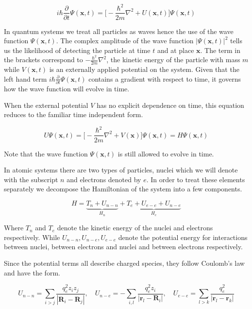 \begin{equation}
i\hbar \frac {\partial}{\partial t} \Psi (\textbf{x},t) = \big[ -\frac{\hbar ^2}{2m}\nabla^2 + U (\textbf{x}, t) \big] \Psi (\textbf{x},t) 
\label {schordinger_time_dependent}
\end{equation}

In quantum systems we treat all particles as waves hence the use of the wave function $\Psi (\textbf{x},t)$. The complex amplitude of the wave function $|\Psi (\textbf {x}, t)|^2$ tells us the likelihood of detecting the particle at time $t$ and at place $\textbf{x}$. The term in the brackets correspond to $-\frac{\hbar ^2}{2m}\nabla^2 $, the kinetic energy of the particle with mass $m$ while $V (\textbf{x}, t)$ is an externally applied potential on the system. Given that the left hand term $i\hbar \frac {\partial}{\partial t} \Psi (\textbf{x},t)$ contains a gradient with respect to time, it governs how the wave function will evolve in time.

When the external potential $V$ has no explicit dependence on time, this equation reduces to the familiar time independent form. 

\begin{equation}
	U \Psi (\textbf{x}, t) = \big[ -\frac{\hbar ^2}{2m}\nabla^2 + V (\textbf{x}) \big] \Psi (\textbf{x}, t) = H \Psi(\textbf{x}, t) 
 \end{equation}

Note that the wave function $\Psi (\textbf {x}, t)$ is still allowed to evolve in time. 

In atomic systems there are two types of particles, nuclei which we will denote with the subscript $n$ and electrons denoted by $e$. In order to treat these elements separately we decompose the Hamiltonian of the system into a few components. 

\begin {equation}
H = \underbrace{T_n + U_{n-n}}_{H_n} + \underbrace{T_e +  U_{e-e} + U_{n-e}}_{H_e}
\end {equation}

Where $T_n$ and $T_e$ denote the kinetic energy of the nuclei and electrons respectively. While $U_{n-n}, U_{n-e}, U_{e-e}$ denote the potential energy for interactions between nuclei, between electrons and nuclei and between electrons respectively.

Since the potential terms all describe charged species, they follow Coulomb's law and have the form.

\begin{equation}
	U_{n-n} = \sum_{i>j} \frac{q_e^2 z_i z_j }{|\textbf{R}_i-\textbf{R}_j|},\quad U_{n-e} = -\sum_{i,l} \frac{q_e^2 z_i }{|\textbf{r}_l-\textbf{R}_i|},\quad  U_{e-e}  = \sum_{l>k} \frac{q_e^2 }{|\textbf{r}_l-\textbf{r}_k|}
\end{equation}

